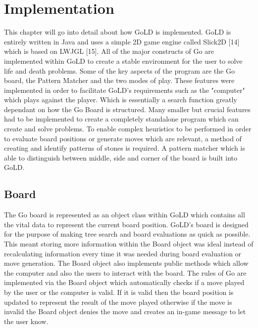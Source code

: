 \documentclass{l4proj}
\begin{document}
\chapter{Implementation}
This chapter will go into detail about how GoLD is implemented. GoLD is entirely written in Java and uses a simple 2D game engine called Slick2D [14] which is based on LWJGL [15]. All of the major constructs of Go are implemented within GoLD to create a stable environment for the user to solve life and death problems. Some of the key aspects of the program are the Go board, the Pattern Matcher and the two modes of play. These features were implemented in order to facilitate GoLD's requirements such as the "computer" which plays against the player. Which is essentially a search function greatly dependant on how the Go Board is structured. Many smaller but crucial features had to be implemented to create a completely standalone program which can create and solve problems. To enable complex heuristics to be performed in order to evaluate board positions or generate moves which are relevant, a method of creating and identify patterns of stones is required. A pattern matcher which is able to distinguish between middle, side and corner of the board is built into GoLD.

\section{Board}

The Go board is represented as an object class within GoLD which contains all the vital data to represent the current board position. GoLD's board is designed for the purpose of making tree search and board evaluations as quick as possible. This meant storing more information within the Board object was ideal instead of recalculating information every time it was needed during board evaluation or move generation. The Board object also implements public methods which allow the computer and also the users to interact with the board. The rules of Go are implemented via the Board object which automatically checks if a move played by the user or the computer is valid. If it is valid then the board position is updated to represent the result of the move played otherwise if the move is invalid the Board object denies the move and creates an in-game message to let the user know.
\end{document}
